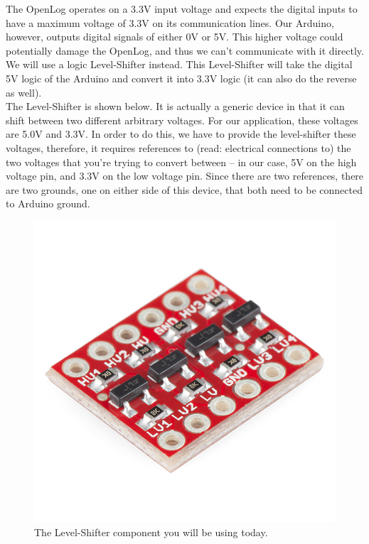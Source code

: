 \documentclass[12pt]{article}
\begin{document}
	The OpenLog operates on a 3.3V input voltage and expects the digital inputs to have a maximum voltage of 3.3V on its communication lines. Our Arduino, however, outputs digital signals of either 0V or 5V. This higher voltage could potentially damage the OpenLog, and thus we can't communicate with it directly. We will use a logic Level-Shifter instead. This Level-Shifter will take the digital 5V logic of the Arduino and convert it into 3.3V logic (it can also do the reverse as well). \\
	
	The Level-Shifter is shown below. It is actually a generic device in that it can shift between two different arbitrary voltages.  For our application, these voltages are 5.0V and 3.3V. In order to do this, we have to provide the level-shifter these voltages, therefore, it requires references to (read: electrical connections to) the two voltages that you're trying to convert between -- in our case, 5V on the high voltage pin, and 3.3V on the low voltage pin. Since there are two references, there are two grounds, one on either side of this device, that both need to be connected to Arduino ground.
	
	\begin{figure}[h]
		\begin{center}
			\includegraphics[scale=0.3]{Figures/level-shifter.jpg}
			\caption{The Level-Shifter component you will be using today.}
		\end{center}
	\end{figure}
	
\end{document}
